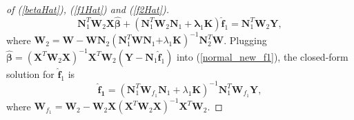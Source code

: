 \documentclass[article,lineno]{biometrika}
\begin{document}
\begin{proof} [of (\ref{betaHat}),  (\ref{f1Hat}) and  (\ref{f2Hat})]
\begin{equation}
\boldsymbol N_1^T  \boldsymbol W_2
\boldsymbol X \boldsymbol {\hat \beta} 
+ 
(\boldsymbol N_1^T  \boldsymbol W_2
\boldsymbol N_1 + \boldsymbol \lambda_1 \boldsymbol K)
\boldsymbol {\hat f}_1
=
\boldsymbol N_1^T  \boldsymbol W_2
\boldsymbol Y,
\end{equation}
where 
$\boldsymbol W_2 =
 \boldsymbol W 
 -
\boldsymbol W \boldsymbol N_2 
 (\boldsymbol N_1^T  \boldsymbol W \boldsymbol N_1 \boldsymbol 
 + \lambda_1 \boldsymbol K)^{-1} 
 \boldsymbol N_2^T  \boldsymbol W$.
Plugging $ \boldsymbol {\hat \beta} = 
(\boldsymbol X^T  \boldsymbol W_2\boldsymbol X)^{-1}  
\boldsymbol X^T  \boldsymbol W_2 (\boldsymbol Y
  - \boldsymbol N_1 \boldsymbol {\hat f}_1) 
$
into  (\ref{normal_new_f1}), the closed-form solution for $ \boldsymbol {\hat f}_1$ is
$$
 \boldsymbol {\hat f_1} 
 =
  (\boldsymbol N_1^T 
\boldsymbol W_{f_1}  \boldsymbol N_1
  + \lambda_1 \boldsymbol K)^{-1}  \boldsymbol N_1^T \boldsymbol W_{f_1} \boldsymbol Y,
  $$
 where
 $\boldsymbol W_{f_1}  =  \boldsymbol W_2 - \boldsymbol W_2\boldsymbol X(\boldsymbol X^T  \boldsymbol W_2\boldsymbol X)^{-1}  \boldsymbol X^T  \boldsymbol W_2$.  
 \end{proof}

%
%
\end{document}
